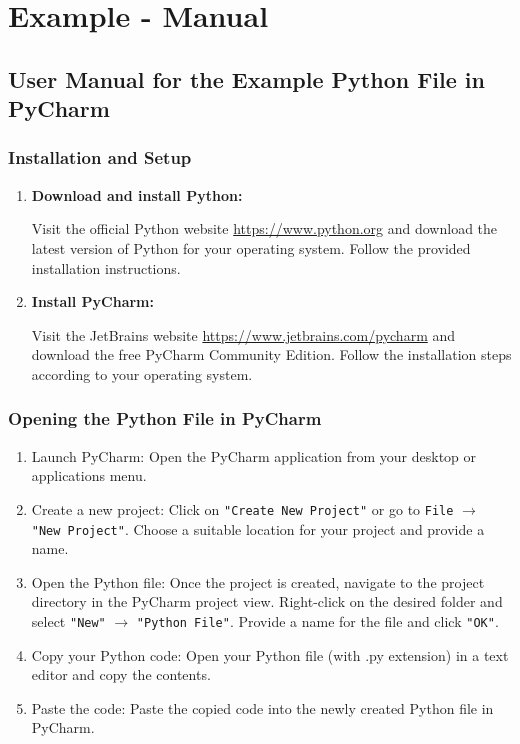 \section{Example - Manual}

\subsection{User Manual for the Example Python File in PyCharm}

\subsubsection{Installation and Setup}

\begin{enumerate}
	
	\item \textbf{Download and install Python:}
	
	Visit the official Python website \url{https://www.python.org} and download the latest version of Python for your operating system. Follow the provided installation instructions.
	
	\item \textbf{Install PyCharm: }
	
	Visit the JetBrains website \url{https://www.jetbrains.com/pycharm} and download the free PyCharm Community Edition. Follow the installation steps according to your operating system.
	
\end{enumerate}

\subsubsection{Opening the Python File in PyCharm}

\begin{enumerate}
	
	\item Launch PyCharm: Open the PyCharm application from your desktop or applications menu.
	
	\item Create a new project: Click on \texttt{"Create New Project"} or go to \texttt{File} $\rightarrow$ \texttt{"New Project"}. Choose a suitable location for your project and provide a name.
	
	\item Open the Python file: Once the project is created, navigate to the project directory in the PyCharm project view. Right-click on the desired folder and select \texttt{"New"} $\rightarrow$ \texttt{"Python File"}. Provide a name for the file and click \texttt{"OK"}.
	
	\item Copy your Python code: Open your Python file (with .py extension) in a text editor and copy the contents.
	
	\item Paste the code: Paste the copied code into the newly created Python file in PyCharm.
	
\end{enumerate}

